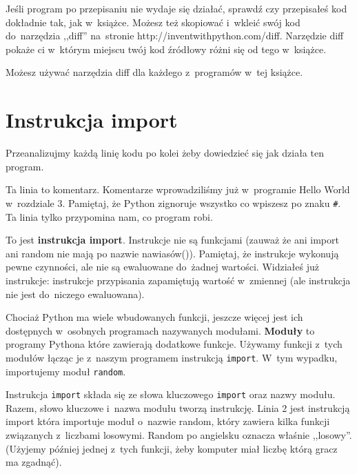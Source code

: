 \documentclass{book}
\begin{document}

Jeśli program po przepisaniu nie wydaje się działać, sprawdź czy przepisałeś kod dokładnie tak, jak w~książce. Możesz też skopiować i~wkleić swój kod do~narzędzia ,,diff'' na~stronie http://inventwithpython.com/diff. Narzędzie diff pokaże ci w~którym miejscu twój kod źródłowy różni się od tego w~książce.

Możesz używać narzędzia diff dla każdego z~programów w~tej książce.

\section{Instrukcja import}

Przeanalizujmy każdą linię kodu po kolei żeby dowiedzieć się jak działa ten program.



Ta linia to komentarz. Komentarze wprowadziliśmy już w~programie Hello World w~rozdziale 3. Pamiętaj, że Python zignoruje wszystko co wpiszesz po znaku \lstinline{#}. Ta linia tylko przypomina nam, co program robi.



To jest {\bf instrukcja import}. Instrukcje nie są funkcjami (zauważ że ani import ani random nie mają po nazwie nawiasów()). Pamiętaj, że instrukcje wykonują pewne czynności, ale nie są ewaluowane do~żadnej wartości. Widziałeś już instrukcje: instrukcje przypisania zapamiętują wartość w~zmiennej (ale instrukcja nie jest do~niczego ewaluowana).

Chociaż Python ma wiele wbudowanych funkcji, jeszcze więcej jest ich dostępnych w~osobnych programach nazywanych modułami. {\bf Moduły} to programy Pythona które zawierają dodatkowe funkcje. Używamy funkcji z~tych modułów łącząc je z~naszym programem instrukcją \lstinline{import}. W~tym wypadku, importujemy moduł \lstinline{random}.

Instrukcja \lstinline{import} składa się ze słowa kluczowego \lstinline{import} oraz nazwy modułu. Razem, słowo kluczowe i~nazwa modułu tworzą instrukcję. Linia 2 jest instrukcją import która importuje moduł o~nazwie random, który zawiera kilka funkcji związanych z~liczbami losowymi. Random po angielsku oznacza właśnie ,,losowy''. (Użyjemy później jednej z~tych funkcji, żeby komputer miał liczbę którą gracz ma zgadnąć).


\end{document}
